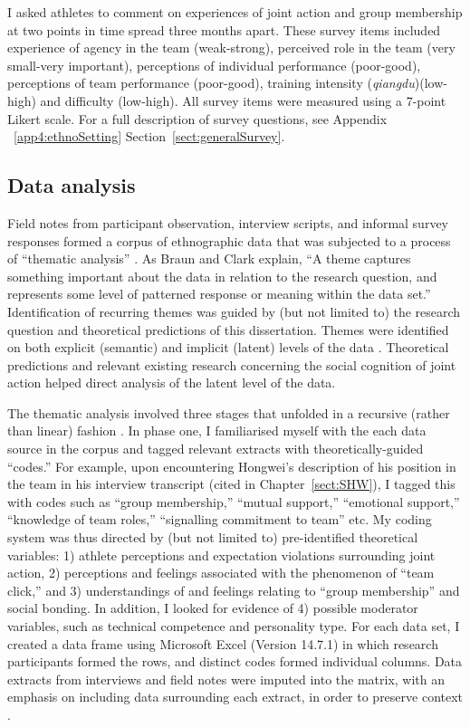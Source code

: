 \begin{CJK}{UTF8}{gbsn}
    I asked athletes to comment on experiences of joint action and group membership at two points in time spread three months apart.  These survey items included experience of agency in the team (weak-strong), perceived role in the team (very small-very important), perceptions of individual performance (poor-good), perceptions of team performance (poor-good), training intensity (\textit{qiangdu})(low-high) and difficulty (low-high).  All survey items were measured using a 7-point Likert scale. For a full description of survey questions, see Appendix ~\ref{app4:ethnoSetting} Section~\ref{sect:generalSurvey}.



\subsection{Data analysis\label{sect:dataAnalysis}}
Field notes from participant observation, interview scripts, and informal survey responses formed a corpus of ethnographic data that was subjected to a process of ``thematic analysis'' \citep{Braun2006}.  As Braun and Clark \textcite[10]{Braun2006} explain, ``A theme captures something important about the data in relation to the research question, and represents some level of patterned response or meaning within the data set.''  Identification of recurring themes was guided by (but not limited to) the research question and theoretical predictions of this dissertation.  Themes were identified on both explicit (semantic) and implicit (latent) levels of the data \citep{Boyatzis1998}.  Theoretical predictions and relevant existing research concerning the social cognition of joint action helped direct analysis of the latent level of the data.

The thematic analysis involved three stages that unfolded in a recursive (rather than linear) fashion \citep{Braun2006}. In phase one, I familiarised myself with the each data source in the corpus and tagged relevant extracts with theoretically-guided ``codes.'' For example, upon encountering Hongwei's description of his position in the team in his interview transcript (cited in Chapter~\ref{sect:SHW}), I tagged this with codes such as ``group membership,'' ``mutual support,'' ``emotional support,'' ``knowledge of team roles,'' ``signalling commitment to team'' etc.  My coding system was thus directed by (but not limited to) pre-identified theoretical variables: 1) athlete perceptions and expectation violations surrounding joint action, 2) perceptions and feelings associated with the phenomenon of ``team click,'' and 3) understandings of and feelings relating to ``group membership'' and social bonding.  In addition, I looked for evidence of 4) possible moderator variables, such as technical competence and personality type.  For each data set, I created a data frame using Microsoft Excel (Version 14.7.1) in which research participants formed the rows, and distinct codes formed individual columns. Data extracts from interviews and field notes were imputed into the matrix, with an emphasis on including data surrounding each extract, in order to preserve context \citep[see][]{Bryman2001}.


\end{CJK}
